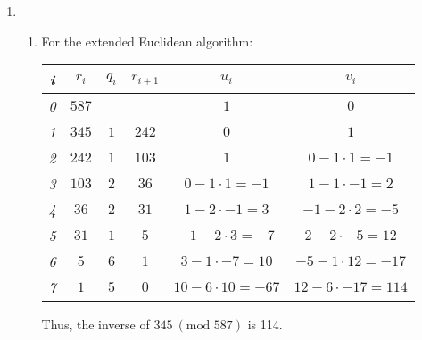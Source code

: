 {\begin{enumerate}
\begin{enumerate}[label=(\roman*)]
        \begin{align*}
            11^1 &\equiv 11 \ (\text{mod } 47) \\
            11^2 &\equiv 27 \ (\text{mod } 47) \\
            11^4 &\equiv 25 \ (\text{mod } 47) \\
            11^8 &\equiv 14 \ (\text{mod } 47) \\
            11^{16} &\equiv 8 \ (\text{mod } 47) \\
            11^{32} &\equiv 17 \ (\text{mod } 47)
        \end{align*}
        Now, we can calculate \(11^{45} = 11^{32} \cdot 11^8 \cdot 11^4 \cdot 11 \equiv 17 \cdot 14 \cdot 25 \cdot 11 \ (\text{mod } 47)\). Further multiplying we get \(17 \cdot 14 \ (\text{mod } 47) \equiv 3\). Then, \(3 \cdot 25 \ (\text{mod } 47) \equiv 28\). And finally, \(28 \cdot 11 \ (\text{mod } 47) \equiv 30\). Thus confirming our previous answer in (i).
    \end{enumerate}
%
%
%
%
%   
    \item \begin{enumerate}[label=(\roman*)]
        \item For the extended Euclidean algorithm:
        \begin{center}
        \begin{tabular}{c|c|c|c|c|c}
            \textit{i} & \textit{\(r_i\)} & \textit{\(q_i\)} & \(r_{i + 1}\) & \textit{\(u_i\)} & \textit{\(v_i\)} \\ \hline
            \textit{0} & \(587\) & \(-\) & \(-\) & \(1\) & \(0\) \\ \hline
            \textit{1} & \(345\) & \(1\) & \(242\) & \(0\) & \(1\) \\ \hline
            \textit{2} & \(242\) & \(1\) & \(103\) & \(1\) & \(0 - 1 \cdot 1 = -1\) \\ \hline
            \textit{3} & \(103\) & \(2\) & \(36\) & \(0 - 1 \cdot 1 = -1\) & \(1 - 1 \cdot -1 = 2\) \\ \hline
            \textit{4} & \(36\) & \(2\) & \(31\) & \(1 - 2 \cdot -1 = 3\) & \(-1 - 2 \cdot 2 = -5\) \\ \hline
            \textit{5} & \(31\) & \(1\) & \(5\) & \(-1 - 2 \cdot 3 = -7\) & \(2 - 2 \cdot -5 = 12\) \\ \hline
            \textit{6} & \(5\) & \(6\) & \(1\) & \(3 - 1 \cdot -7 = 10\) & \(-5 - 1 \cdot 12 = -17\) \\ \hline
            \textit{7} & \(1\) & \(5\) & \(0\) & \(10 - 6 \cdot 10 = -67\) & \(12 - 6 \cdot -17 = 114\) 
        \end{tabular} 
        \end{center}
        Thus, the inverse of \(345 \ (\text{mod } 587)\) is 114.
        

\end{enumerate}
\end{enumerate}}
